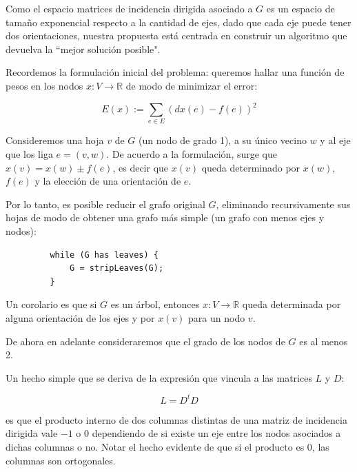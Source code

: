 \documentclass[10pt, a4paper, twocolumn]{article} %
\begin{document}
Como el espacio matrices de incidencia dirigida asociado a $G$ es un 
espacio de tamaño exponencial respecto a la cantidad de ejes, dado que 
cada eje puede tener dos orientaciones, nuestra propuesta está centrada 
en construir un algoritmo que devuelva la ``mejor solución posible".

\bigskip


Recordemos la formulación inicial del problema: queremos hallar una 
función de pesos en los nodos $x: V \rightarrow \mathbb{R}$ de modo de 
minimizar el error:

$$E(x) := \sum_{e \in E} (dx(e) - f(e))^2$$

Consideremos una hoja $v$ de $G$ (un nodo de grado 1), a su único 
vecino $w$ y al eje que los liga $e=(v,w)$. De acuerdo a la formulación, 
surge que $x(v) = x(w) \pm f(e)$, es decir que $x(v)$ queda 
determinado por $x(w)$, $f(e)$ y la elección de una orientación de $e$.

\smallskip

Por lo tanto, es posible reducir el grafo original $G$, eliminando 
recursivamente sus  hojas de modo de obtener una grafo más simple (un 
grafo con menos ejes y nodos):

\begin{verbatim}
         while (G has leaves) {
             G = stripLeaves(G);
         }
\end{verbatim}

Un corolario es que si $G$ es un árbol, entonces $x: V 
\rightarrow \mathbb{R}$ queda determinada por alguna orientación de 
los ejes y por $x(v)$ para un nodo $v$.

\smallskip

De ahora en adelante consideraremos que el grado de los nodos de $G$ es 
al menos 2.
 
\bigskip


Un hecho simple que se deriva de la expresión que vincula a las matrices 
$L$ y $D$:

$$L = D^t D$$

es que el producto interno de dos columnas distintas de una matriz de 
incidencia dirigida vale $-1$ o $0$ dependiendo de si existe un eje 
entre los nodos asociados a dichas columnas o no. Notar el hecho 
evidente de que si el producto es $0$, las columnas son
 ortogonales.

\smallskip
\end{document}
